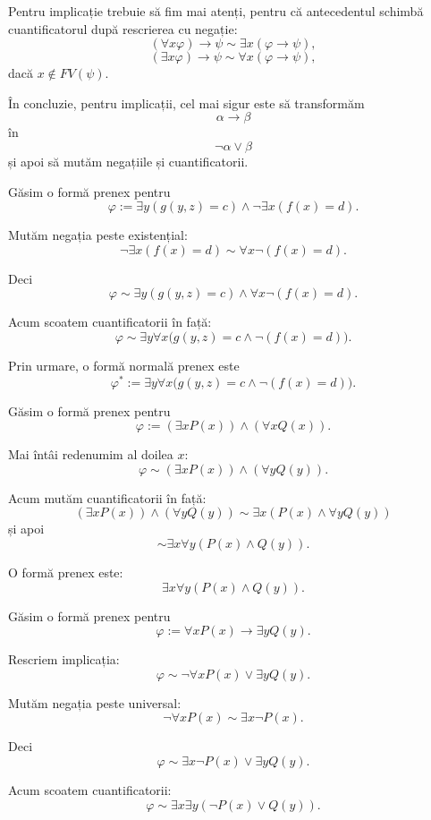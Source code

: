 Pentru implicație trebuie să fim mai atenți, pentru că antecedentul schimbă cuantificatorul după rescrierea cu negație:
\[
	(\forall x\varphi) \to \psi \sim \exists x(\varphi \to \psi),
\]
\[
	(\exists x\varphi) \to \psi \sim \forall x(\varphi \to \psi),
\]
dacă \(x \notin FV(\psi)\).

În concluzie, pentru implicații, cel mai sigur este să transformăm
\[
	\alpha \to \beta
\]
în
\[
	\neg \alpha \lor \beta
\]
și apoi să mutăm negațiile și cuantificatorii.

\begin{eg}
	Găsim o formă prenex pentru
	\[
		\varphi := \exists y(g(y,z)=c) \land \neg\exists x(f(x)=d).
	\]

	Mutăm negația peste existențial:
	\[
		\neg\exists x(f(x)=d)
		\sim
		\forall x\neg(f(x)=d).
	\]

	Deci
	\[
		\varphi
		\sim
		\exists y(g(y,z)=c) \land \forall x\neg(f(x)=d).
	\]

	Acum scoatem cuantificatorii în față:
	\[
		\varphi
		\sim
		\exists y \forall x\big(g(y,z)=c \land \neg(f(x)=d)\big).
	\]

	Prin urmare, o formă normală prenex este
	\[
		\varphi^* :=
		\exists y \forall x\big(g(y,z)=c \land \neg(f(x)=d)\big).
	\]
\end{eg}

\begin{eg}
	Găsim o formă prenex pentru
	\[
		\varphi := (\exists xP(x)) \land (\forall xQ(x)).
	\]

	Mai întâi redenumim al doilea \(x\):
	\[
		\varphi \sim (\exists xP(x)) \land (\forall yQ(y)).
	\]

	Acum mutăm cuantificatorii în față:
	\[
		(\exists xP(x)) \land (\forall yQ(y))
		\sim
		\exists x(P(x) \land \forall yQ(y))
	\]
	și apoi
	\[
		\sim
		\exists x\forall y(P(x)\land Q(y)).
	\]

	O formă prenex este:
	\[
		\exists x\forall y(P(x)\land Q(y)).
	\]
\end{eg}

\begin{eg}
	Găsim o formă prenex pentru
	\[
		\varphi := \forall xP(x) \to \exists yQ(y).
	\]

	Rescriem implicația:
	\[
		\varphi \sim \neg\forall xP(x) \lor \exists yQ(y).
	\]

	Mutăm negația peste universal:
	\[
		\neg\forall xP(x) \sim \exists x\neg P(x).
	\]

	Deci
	\[
		\varphi \sim \exists x\neg P(x) \lor \exists yQ(y).
	\]

	Acum scoatem cuantificatorii:
	\[
		\varphi \sim \exists x\exists y(\neg P(x)\lor Q(y)).
	\]
\end{eg}

